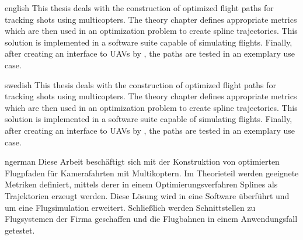 \begin{myAbstract}{english}
This thesis deals with the construction of optimized flight paths for tracking shots using multicopters.
The theory chapter defines appropriate metrics which are then used in an optimization problem to create spline trajectories.
This solution is implemented in a software suite capable of simulating flights.
Finally, after creating an interface to UAVs by \asctec, the paths are tested in an exemplary use case.
\end{myAbstract}

\begin{myAbstract}{swedish}
This thesis deals with the construction of optimized flight paths for tracking shots using multicopters.
The theory chapter defines appropriate metrics which are then used in an optimization problem to create spline trajectories.
This solution is implemented in a software suite capable of simulating flights.
Finally, after creating an interface to UAVs by \asctec, the paths are tested in an exemplary use case.
\end{myAbstract}

\begin{myAbstract}{ngerman}
Diese Arbeit beschäftigt sich mit der Konstruktion von optimierten Flugpfaden für Kamerafahrten mit Multikoptern.
Im Theorieteil werden geeignete Metriken definiert, mittels derer in einem Optimierungsverfahren Splines als Trajektorien erzeugt werden.
Diese Lösung wird in eine Software überführt und um eine Flugsimulation erweitert.
Schließlich werden Schnittstellen zu Flugsystemen der Firma \asctec geschaffen und die Flugbahnen in einem Anwendungsfall getestet.
\end{myAbstract}
